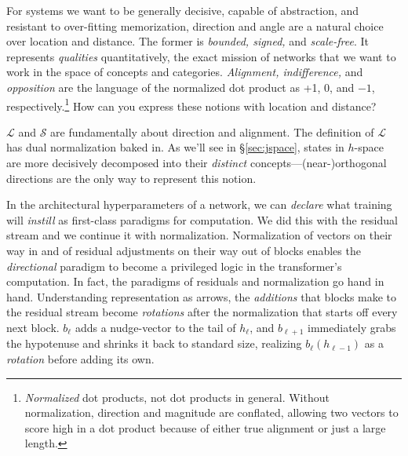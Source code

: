 \documentclass{article}
\newcommand{\jlens}{\mathscr{L}}
\newcommand{\jspace}{\mathscr{S}}
\begin{document}
For systems we want to be generally decisive, capable of abstraction, and resistant to over-fitting memorization, direction and angle are a natural choice over location and distance. The former is \textit{bounded, signed, }and\textit{ scale-free}. It represents \textit{qualities} quantitatively, the exact mission of networks that we want to work in the space of concepts and categories. \textit{Alignment, indifference, }and\textit{ opposition} are the language of the normalized dot product as +1, 0, and $-1$, respectively.\footnote{\textit{Normalized} dot products, not dot products in general. Without normalization, direction and magnitude are conflated, allowing two vectors to score high in a dot product because of either true alignment or just a large length.} How can you express these notions with location and distance? 

\(\jlens\) and \(\jspace\) are fundamentally about direction and alignment. The definition of \(\jlens\) has dual normalization baked in. As we'll see in \S\ref{sec:jspace}, states in \(h\)-space are more decisively decomposed into their \textit{distinct} concepts---(near-)orthogonal directions are the only way to represent this notion. 

In the architectural hyperparameters of a network, we can \textit{declare} what training will \textit{instill} as first-class paradigms for computation. We did this with the residual stream and we continue it with normalization. Normalization of vectors on their way in and of residual adjustments on their way out of blocks enables the \textit{directional} paradigm to become a privileged logic in the transformer's computation. In fact, the paradigms of residuals and normalization go hand in hand. Understanding representation as arrows, the \textit{additions} that blocks make to the residual stream become \textit{rotations} after the normalization that starts off every next block. \(b_\ell\) adds a nudge-vector to the tail of \(h_\ell\), and \(b_{\ell+1}\) immediately grabs the hypotenuse and shrinks it back to standard size, realizing \(b_\ell(h_{\ell-1})\) as a \textit{rotation} before adding its own.
\end{document}
